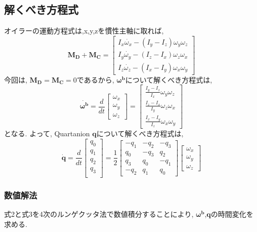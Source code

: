 \documentclass[class=article, crop=false, dvipdfmx, fleqn]{standalone}
\begin{document}
\subsection{解くべき方程式}
オイラーの運動方程式は,x,y,zを慣性主軸に取れば,
\begin{equation}
  \bm{M_D} + \bm{M_C}
  =
  \begin{bmatrix}
    I_x\dot{\omega_x} - (I_y - I_z)\omega_y \omega_z \\
    I_y\dot{\omega_y} - (I_z - I_x)\omega_z \omega_x \\
    I_z\dot{\omega_z} - (I_x - I_y)\omega_x \omega_y
  \end{bmatrix}
\end{equation}
今回は, $\bm{M_D} = \bm{M_C} = 0$であるから, ${\bm{\omega^b}}$について解くべき方程式は,
\begin{equation}
  \dot{\bm{\omega^b}} = \frac{d}{dt}
  \begin{bmatrix}
    \omega_x \\
    \omega_y \\
    \omega_z
  \end{bmatrix}
  =
  \begin{bmatrix}
    \displaystyle \frac{I_y - I_z}{I_x} \omega_y \omega_z \\
    \displaystyle \frac{I_z - I_x}{I_y} \omega_z \omega_x \\
    \displaystyle \frac{I_x - I_y}{I_z} \omega_x \omega_y
  \end{bmatrix}
\end{equation}
となる. よって, Quartanion $\bm{q}$について解くべき方程式は,
\begin{equation}
  \dot{\bm{q}} = \frac{d}{dt}
  \begin{bmatrix}
    q_0 \\
    q_1 \\
    q_2 \\
    q_3 \\
  \end{bmatrix}
  = \frac{1}{2}
  \begin{bmatrix}
    -q_1 & -q_2 & -q_3 \\
    q_0 & -q_3 & q_2 \\
    q_3 & q_0 & -q_1 \\
    -q_2 & q_1 & q_0
  \end{bmatrix}
  \begin{bmatrix}
    \omega_x \\
    \omega_y \\
    \omega_z
  \end{bmatrix}
\end{equation}

\subsubsection{数値解法}
式2と式3を4次のルンゲクッタ法で数値積分することにより,
$\bm{\omega^b}$,$\bm{q}$の時間変化を求める.
\end{document}
